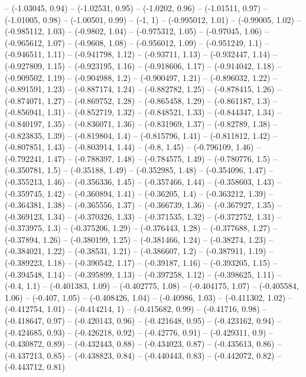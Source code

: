 -- (-1.03045, 0.94)
-- (-1.02531, 0.95)
-- (-1.0202, 0.96)
-- (-1.01511, 0.97)
-- (-1.01005, 0.98)
-- (-1.00501, 0.99)
-- (-1, 1)
-- (-0.995012, 1.01)
-- (-0.99005, 1.02)
-- (-0.985112, 1.03)
-- (-0.9802, 1.04)
-- (-0.975312, 1.05)
-- (-0.97045, 1.06)
-- (-0.965612, 1.07)
-- (-0.9608, 1.08)
-- (-0.956012, 1.09)
-- (-0.951249, 1.1)
-- (-0.946511, 1.11)
-- (-0.941798, 1.12)
-- (-0.93711, 1.13)
-- (-0.932447, 1.14)
-- (-0.927809, 1.15)
-- (-0.923195, 1.16)
-- (-0.918606, 1.17)
-- (-0.914042, 1.18)
-- (-0.909502, 1.19)
-- (-0.904988, 1.2)
-- (-0.900497, 1.21)
-- (-0.896032, 1.22)
-- (-0.891591, 1.23)
-- (-0.887174, 1.24)
-- (-0.882782, 1.25)
-- (-0.878415, 1.26)
-- (-0.874071, 1.27)
-- (-0.869752, 1.28)
-- (-0.865458, 1.29)
-- (-0.861187, 1.3)
-- (-0.856941, 1.31)
-- (-0.852719, 1.32)
-- (-0.848521, 1.33)
-- (-0.844347, 1.34)
-- (-0.840197, 1.35)
-- (-0.836071, 1.36)
-- (-0.831969, 1.37)
-- (-0.82789, 1.38)
-- (-0.823835, 1.39)
-- (-0.819804, 1.4)
-- (-0.815796, 1.41)
-- (-0.811812, 1.42)
-- (-0.807851, 1.43)
-- (-0.803914, 1.44)
-- (-0.8, 1.45)
-- (-0.796109, 1.46)
-- (-0.792241, 1.47)
-- (-0.788397, 1.48)
-- (-0.784575, 1.49)
-- (-0.780776, 1.5)
-- (-0.350781, 1.5)
-- (-0.35188, 1.49)
-- (-0.352985, 1.48)
-- (-0.354096, 1.47)
-- (-0.355213, 1.46)
-- (-0.356336, 1.45)
-- (-0.357466, 1.44)
-- (-0.358603, 1.43)
-- (-0.359745, 1.42)
-- (-0.360894, 1.41)
-- (-0.36205, 1.4)
-- (-0.363212, 1.39)
-- (-0.364381, 1.38)
-- (-0.365556, 1.37)
-- (-0.366739, 1.36)
-- (-0.367927, 1.35)
-- (-0.369123, 1.34)
-- (-0.370326, 1.33)
-- (-0.371535, 1.32)
-- (-0.372752, 1.31)
-- (-0.373975, 1.3)
-- (-0.375206, 1.29)
-- (-0.376443, 1.28)
-- (-0.377688, 1.27)
-- (-0.37894, 1.26)
-- (-0.380199, 1.25)
-- (-0.381466, 1.24)
-- (-0.38274, 1.23)
-- (-0.384021, 1.22)
-- (-0.38531, 1.21)
-- (-0.386607, 1.2)
-- (-0.387911, 1.19)
-- (-0.389223, 1.18)
-- (-0.390542, 1.17)
-- (-0.39187, 1.16)
-- (-0.393205, 1.15)
-- (-0.394548, 1.14)
-- (-0.395899, 1.13)
-- (-0.397258, 1.12)
-- (-0.398625, 1.11)
-- (-0.4, 1.1)
-- (-0.401383, 1.09)
-- (-0.402775, 1.08)
-- (-0.404175, 1.07)
-- (-0.405584, 1.06)
-- (-0.407, 1.05)
-- (-0.408426, 1.04)
-- (-0.40986, 1.03)
-- (-0.411302, 1.02)
-- (-0.412754, 1.01)
-- (-0.414214, 1)
-- (-0.415682, 0.99)
-- (-0.41716, 0.98)
-- (-0.418647, 0.97)
-- (-0.420143, 0.96)
-- (-0.421648, 0.95)
-- (-0.423162, 0.94)
-- (-0.424685, 0.93)
-- (-0.426218, 0.92)
-- (-0.42776, 0.91)
-- (-0.429311, 0.9)
-- (-0.430872, 0.89)
-- (-0.432443, 0.88)
-- (-0.434023, 0.87)
-- (-0.435613, 0.86)
-- (-0.437213, 0.85)
-- (-0.438823, 0.84)
-- (-0.440443, 0.83)
-- (-0.442072, 0.82)
-- (-0.443712, 0.81)

